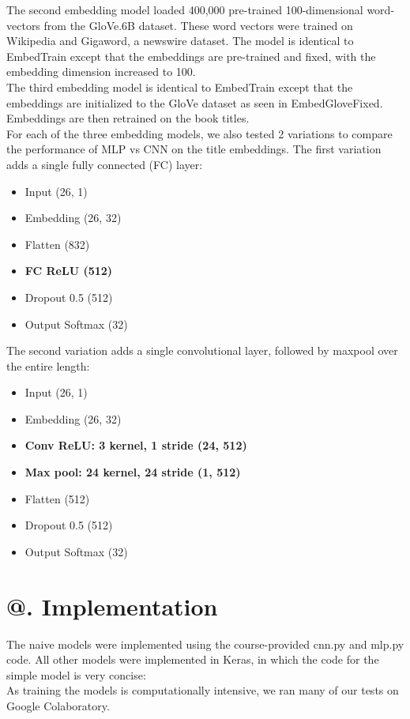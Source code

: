 \documentclass[jou,apacite, 10px]{apa6}
\makeatletter
\newcommand*{\rom}[1]{\expandafter\@slowromancap\romannumeral #1@}
\makeatother
\begin{document}
The second embedding model loaded 400,000 pre-trained 100-dimensional word-vectors from the GloVe.6B dataset. These word vectors were trained on Wikipedia and Gigaword, a newswire dataset. The model is identical to EmbedTrain except that the embeddings are pre-trained and fixed, with the embedding dimension increased to 100.\\
The third embedding model is identical to EmbedTrain except that the embeddings are initialized to the GloVe dataset as seen in EmbedGloveFixed. Embeddings are then retrained on the book titles.\\
For each of the three embedding models, we also tested 2 variations to compare the performance of MLP vs CNN on the title embeddings. The first variation adds a single fully connected (FC) layer:\\
\begin{itemize}
    \item Input (26, 1)
    \item Embedding (26, 32)
    \item Flatten (832)
    \item \textbf{FC ReLU (512)}
    \item Dropout 0.5 (512)
    \item Output Softmax (32)
\end{itemize}\rule{0pt}{4ex}
The second variation adds a single convolutional layer, followed by maxpool over the entire length:

\begin{itemize}
    \item Input (26, 1)
    \item Embedding (26, 32)
    \item \textbf{Conv ReLU: 3 kernel, 1 stride (24, 512)}
    \item \textbf{Max pool: 24 kernel, 24 stride (1, 512)}
    \item Flatten (512)
    \item Dropout 0.5 (512)
    \item Output Softmax (32)
\end{itemize}

\section{\rom{4}. Implementation}

The naive models were implemented using the course-provided cnn.py and mlp.py code. All other models were implemented in Keras, in which the code for the simple model is very concise:\\

As training the models is computationally intensive, we ran many of our tests on Google Colaboratory.\\
\end{document}
